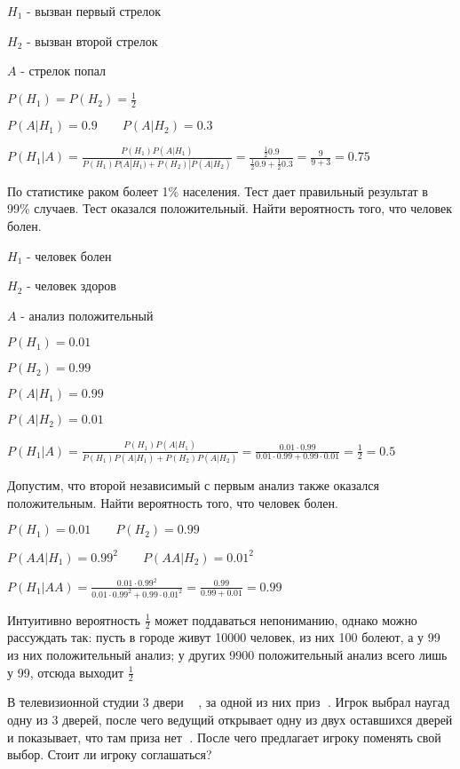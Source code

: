 \documentclass[12pt]{article}
\begin{document}
    $H_1$ - вызван первый стрелок

    $H_2$ - вызван второй стрелок

    $A$ - стрелок попал

    $P(H_1) = P(H_2) = \frac{1}{2}$

    $P(A|H_1) = 0.9 \quad\quad P(A|H_2) = 0.3$

    $P(H_1 | A) = \frac{P(H_1) P(A|H_1)}{P(H_1) P(A|H_1) + P(H_2) | P(A | H_2)} = \frac{\frac{1}{2} 0.9}{\frac{1}{2} 0.9 + \frac{1}{2} 0.3} = \frac{9}{9 + 3} = 0.75$

     По статистике раком болеет 1\% населения. Тест дает правильный результат в 99\% случаев. Тест оказался положительный. Найти вероятность того, что человек болен.

    $H_1$ - человек болен

    $H_2$ - человек здоров

    $A$ - анализ положительный

    $P(H_1) = 0.01$

    $P(H_2) = 0.99$

    $P(A|H_1) = 0.99$

    $P(A|H_2) = 0.01$

    $P(H_1 | A) = \frac{P(H_1)P(A | H_1)}{P(H_1) P(A | H_1) + P(H_2) P(A | H_2)} = \frac{0.01 \cdot 0.99}{0.01 \cdot 0.99 + 0.99 \cdot 0.01} = \frac{1}{2} = 0.5$

    Допустим, что второй независимый с первым анализ также оказался положительным. Найти вероятность того, что человек болен.

    $P(H_1) = 0.01 \quad\quad P(H_2) = 0.99$

    $P(AA|H_1) = 0.99^2 \quad\quad P(AA|H_2) = 0.01^2$

    $P(H_1 | AA) = \frac{0.01 \cdot 0.99^2}{0.01 \cdot 0.99^2 + 0.99 \cdot 0.01^2} = \frac{0.99}{0.99 + 0.01} = 0.99$

    Интуитивно вероятность $\frac{1}{2}$ может поддаваться непониманию, однако можно рассуждать так:
    пусть в городе живут 10000 человек, из них 100 болеют, а у 99 из них положительный анализ; у других 9900 положительный анализ всего лишь у 99, отсюда выходит $\frac{1}{2}$

     В телевизионной студии 3 двери {\Large 🚪🚪🚪}, за одной из них приз {\Large 🚗}.
    Игрок выбрал наугад одну из 3 дверей, после чего ведущий открывает одну из двух оставшихся дверей и показывает, что там приза нет {\Large 🛴}. После чего
    предлагает игроку поменять свой выбор. Стоит ли игроку соглашаться?
\end{document}
